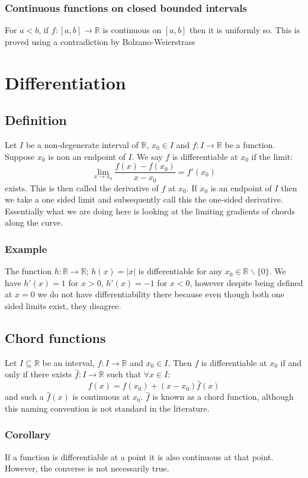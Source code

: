 \documentclass[12pt]{article}
\begin{document}
\subsubsection*{Continuous functions on closed bounded intervals}
For \(a<b\), if \(f:[a,b]\to\mathbb{R}\) is continuous on \([a,b]\) then it is uniformly so. This is proved using a contradiction by Bolzano-Weierstrass
\section{Differentiation}
\subsection*{Definition}
Let \(I\) be a non-degenerate interval of \(\mathbb{R}\), \(x_0\in I\) and \(f:I\to\mathbb{R}\) be a function. Suppose \(x_0\) is non an endpoint of \(I\). We say \(f\) is differentiable at \(x_0\) if the limit:
\[\lim_{x\to x_0}\frac{f(x)-f(x_0)}{x-x_0}=f'(x_0)\]
exists. This is then called the derivative of \(f\) at \(x_0\). If \(x_0\) is an endpoint of \(I\) then we take a one sided limit and subsequently call this the one-sided derivative. Essentially what we are doing here is looking at the limiting gradients of chords along the curve.
\subsubsection*{Example}
The function \(h:\mathbb{R}\to\mathbb{R};\, h(x)=|x|\) is differentiable for any \(x_0\in\mathbb{R}\backslash\{0\}\). We have \(h'(x)=1\) for \(x>0\), \(h'(x)=-1\) for \(x<0\), however despite being defined at \(x=0\) we do not have differentiability there because even though both one sided limits exist, they disagree. 
\subsection*{Chord functions}
Let \(I\subseteq \mathbb{R}\) be an interval, \(f:I\to\mathbb{R}\) and \(x_0\in I\). Then \(f\) is differentiable at \(x_0\) if and only if there exists \(\hat{f}:I\to\mathbb{R}\) such that \(\forall x\in I\):
\[f(x)=f(x_0)+(x-x_0)\hat{f}(x)\]
and such a \(\hat{f}(x)\) is continuous at \(x_0\). \(\hat{f}\) is known as a chord function, although this naming convention is not standard in the literature.
\subsubsection*{Corollary}
If a function is differentiable at a point it is also continuous at that point. However, the converse is not necessarily true.
\end{document}
